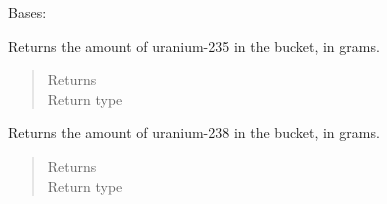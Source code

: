 \documentclass[letterpaper,10pt,openany,oneside,english]{sphinxmanual}
\begin{document}
\begin{fulllineitems}
\label{\detokenize{support_rst/fuel_bundle:fuel_bundle.FuelBundle}}
Bases: 

\begin{fulllineitems}
\label{\detokenize{support_rst/fuel_bundle:fuel_bundle.FuelBundle.fresh_u235_mass}}
Returns the amount of uranium-235 in the bucket, in grams.
\begin{quote}\begin{description}
\item[{Returns}] \leavevmode
{}

\item[{Return type}] \leavevmode
{}

\end{description}\end{quote}

\end{fulllineitems}


\begin{fulllineitems}
\label{\detokenize{support_rst/fuel_bundle:fuel_bundle.FuelBundle.fresh_u238_mass}}
Returns the amount of uranium-238 in the bucket, in grams.
\begin{quote}\begin{description}
\item[{Returns}] \leavevmode
{}

\item[{Return type}] \leavevmode
{}

\end{description}\end{quote}

\end{fulllineitems}


\end{fulllineitems}
\end{document}
